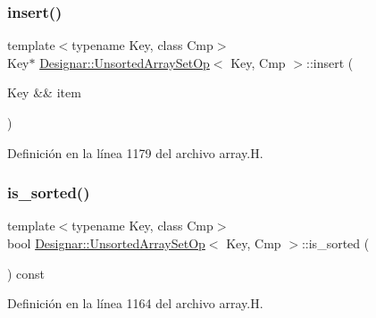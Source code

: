 \subsubsection{\texorpdfstring{insert()}{insert()}\hspace{0.1cm}{\footnotesize\ttfamily [2/2]}}
{\footnotesize\ttfamily template$<$typename Key, class Cmp$>$ \\
Key$\ast$ \hyperlink{class_designar_1_1_unsorted_array_set_op}{Designar\+::\+Unsorted\+Array\+Set\+Op}$<$ Key, Cmp $>$\+::insert (\begin{DoxyParamCaption}\item[{Key \&\&}]{item }\end{DoxyParamCaption})\hspace{0.3cm}{\ttfamily [inline]}}



Definición en la línea 1179 del archivo array.\+H.

\mbox{\label{class_designar_1_1_unsorted_array_set_op_afc0e1e303afc39e67727d985a0eb122e}} 
\subsubsection{\texorpdfstring{is\+\_\+sorted()}{is\_sorted()}}
{\footnotesize\ttfamily template$<$typename Key, class Cmp$>$ \\
bool \hyperlink{class_designar_1_1_unsorted_array_set_op}{Designar\+::\+Unsorted\+Array\+Set\+Op}$<$ Key, Cmp $>$\+::is\+\_\+sorted (\begin{DoxyParamCaption}{ }\end{DoxyParamCaption}) const\hspace{0.3cm}{\ttfamily [inline]}}



Definición en la línea 1164 del archivo array.\+H.

\mbox{\label{class_designar_1_1_unsorted_array_set_op_aed07acdf2c6e94cbe1392e78f9484c2a}} 
